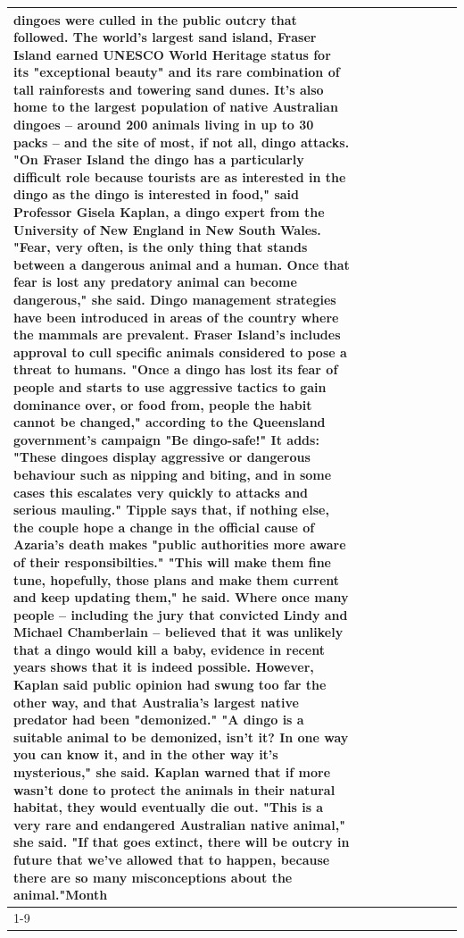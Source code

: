 \begin{table}[H]
\begin{tabular}{lllrlllll}
dingoes were culled in the public outcry that followed. The world's largest sand island, Fraser Island earned UNESCO World Heritage status for its "exceptional beauty" and its rare combination of tall rainforests and towering sand dunes. It's also home to the largest population of native Australian dingoes -- around 200 animals living in up to 30 packs -- and the site of most, if not all, dingo attacks. "On Fraser Island the dingo has a particularly difficult role because tourists are as interested in the dingo as the dingo is interested in food," said Professor Gisela Kaplan, a dingo expert from the University of New England in New South Wales. "Fear, very often, is the only thing that stands between a dangerous animal and a human. Once that fear is lost any predatory animal can become dangerous," she said. Dingo management strategies have been introduced in areas of the country where the mammals are prevalent. Fraser Island's includes approval to cull specific animals considered to pose a threat to humans. "Once a dingo has lost its fear of people and starts to use aggressive tactics to gain dominance over, or food from, people the habit cannot be changed," according to the Queensland government's campaign "Be dingo-safe!" It adds: "These dingoes display aggressive or dangerous behaviour such as nipping and biting, and in some cases this escalates very quickly to attacks and serious mauling." Tipple says that, if nothing else, the couple hope a change in the official cause of Azaria's death makes "public authorities more aware of their responsibilties." "This will make them fine tune, hopefully, those plans and make them current and keep updating them," he said. Where once many people -- including the jury that convicted Lindy and Michael Chamberlain -- believed that it was unlikely that a dingo would kill a baby, evidence in recent years shows that it is indeed possible. However, Kaplan said public opinion had swung too far the other way, and that Australia's largest native predator had been "demonized." "A dingo is a suitable animal to be demonized, isn't it? In one way you can know it, and in the other way it's mysterious," she said. Kaplan warned that if more wasn't done to protect the animals in their natural habitat, they would eventually die out. "This is a very rare and endangered Australian native animal," she said. "If that goes extinct, there will be outcry in future that we've allowed that to happen, because there are so many misconceptions about the animal."Month \\
\cline{1-9}

\end{tabular}
\end{table}
